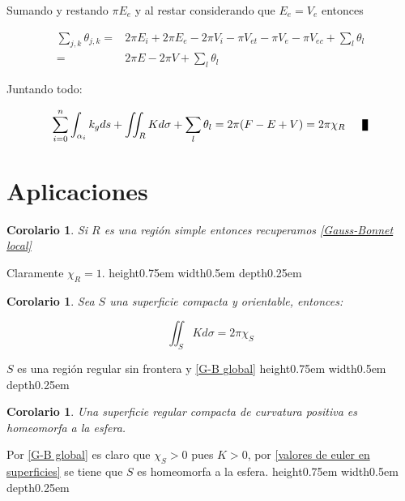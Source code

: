 \documentclass[11pt]{article}
\newtheorem{corollary}[theorem]{Corolario}
\newenvironment{proof}[1][Demostraci\'on]{\begin{trivlist}
		\item[\hskip \labelsep {\bfseries #1}]}{\end{trivlist}}
\newcommand{\qed}{\nobreak \ifvmode \relax \else
	\ifdim\lastskip<1.5em \hskip-\lastskip
	\hskip1.5em plus0em minus0.5em \fi \nobreak
	\vrule height0.75em width0.5em depth0.25em\fi}
\begin{document}
\begin{proof}
	Sumando y restando $\pi E_e$ y al restar considerando que $E_e =  V_e$ entonces
	
	\begin{equation*}
	\begin{aligned}
	\sum\limits_{j,k}{ \theta_{j,k}} =  & 2\pi E_i + 2\pi E_e -  2 \pi V_i - \pi V_{et} - \pi V_e - \pi V_{ec} + \sum\limits_{l}{\theta_{l}} \\
									 = & 2\pi E - 2\pi V + \sum\limits_{l}{\theta_{l}}
	\end{aligned}	
	\end{equation*}		
	
	Juntando todo:

	\begin{equation*}
	\sum\limits_{i=0}^{n}\int_{\alpha_i} k_g ds + \iint_{R} Kd\sigma + \sum\limits_{l}{\theta_l} = 2\pi (F-E+V) = 2\pi \chi_R \qed
	\end{equation*}	
	
\end{proof}

\section{Aplicaciones}

\begin{corollary}
	Si $R$ es una regi\'on simple entonces recuperamos \ref{Gauss-Bonnet local}
\end{corollary}

\begin{proof}
	Claramente $\chi_R = 1$. \qed
\end{proof}

\begin{corollary}
	Sea $S$ una superficie compacta y orientable, entonces:
	
	\[
	\iint_S Kd\sigma = 2\pi \chi_S
	\]
	
\end{corollary}

\begin{proof}
	$S$ es una regi\'on regular sin frontera y \ref{G-B global} \qed
\end{proof}

\begin{corollary}
	\label{Curvatura positiva es homeo a la esfera}
	Una superficie regular compacta de curvatura positiva es homeomorfa a la esfera.
\end{corollary}

\begin{proof}
	Por \ref{G-B global} es claro que $\chi_S > 0$ pues $K>0$, por \ref{valores de euler en superficies} se tiene que $S$ es homeomorfa a la esfera. \qed
\end{proof}
\end{document}
